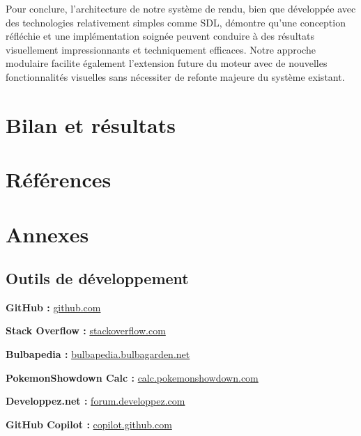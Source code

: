 \documentclass[12pt,a4paper, twoside]{article}
\begin{document}
Pour conclure, l'architecture de notre système de rendu, bien que développée avec des technologies relativement simples comme SDL, démontre qu'une conception réfléchie et une implémentation soignée peuvent conduire à des résultats visuellement impressionnants et techniquement efficaces. Notre approche modulaire facilite également l'extension future du moteur avec de nouvelles fonctionnalités visuelles sans nécessiter de refonte majeure du système existant.
\newpage
\section{Bilan et résultats}
\section{Références}
\section{Annexes}

\subsection{Outils de développement}
\label{annexe:github}
\textbf{GitHub :} \href{https://github.com/Lounol72/ICPocket}{github.com}

\label{annexe:stackoverflow}
\textbf{Stack Overflow :} \href{https://stackoverflow.com/questions/tagged/sdl}{stackoverflow.com}

\label{annexe:bulbapedia}
\textbf{Bulbapedia :} \href{https://bulbapedia.bulbagarden.net/wiki}{bulbapedia.bulbagarden.net}

\label{annexe:showdown}
\textbf{PokemonShowdown Calc :} \href{https://calc.pokemonshowdown.com}{calc.pokemonshowdown.com}

\label{annexe:developpez}
\textbf{Developpez.net :} \href{https://forum.developpez.com}{forum.developpez.com}

\label{annexe:copilot}
\textbf{GitHub Copilot :} \href{https://copilot.github.com/}{copilot.github.com}
\end{document}
